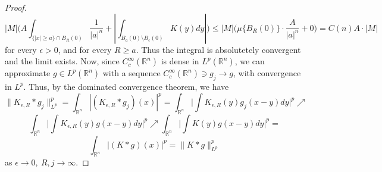 \documentclass[12pt]{article}
\begin{document}
\begin{proof}
$$|M| \Big(A \int_{\{|x| \ge a\} \cap B_R(0)} \dfrac{1}{|a|^n} + |\int_{B_{a}(0) \setminus B_\epsilon(0)} K(y) dy| \Big) \le |M| \Big(\mu\{B_R(0)\} \cdot \dfrac{A}{|a|^n} + 0 \Big) = C(n)A \cdot |M|$$
for every $\epsilon > 0$, and for every $R \ge a$. Thus the integral is absolutetely convergent and the limit exists. Now, since $C_c^\infty(\mathbb{R}^n)$ is dense in $L^p(\mathbb{R}^n)$, we can approximate $g \in L^p(\mathbb{R}^n)$ with a sequence $C_c^\infty(\mathbb{R}^n) \ni g_j \rightarrow g$, with convergence in $L^p$. Thus, by the dominated convergence theorem, we have
$$\|K_{\epsilon, R} * g_j\|_{L^p}^p = \int_{\mathbb{R}^n} |(K_{\epsilon, R} * g_j)(x)|^p = \int_{\mathbb{R}^n} \Big| \int K_{\epsilon, R}(y) g_j(x-y) dy \Big|^p \nearrow$$
$$\int_{\mathbb{R}^n} \Big| \int K_{\epsilon, R}(y) g(x-y) dy \Big|^p \nearrow \int_{\mathbb{R}^n} \Big| \int K(y) g(x-y) dy \Big|^p =$$
$$\int_{\mathbb{R}^n} |(K * g)(x)|^p = \|K * g\|_{L^p}^p$$
as $\epsilon \rightarrow 0,\ R, j \rightarrow \infty$.
\end{proof}
\end{document}
